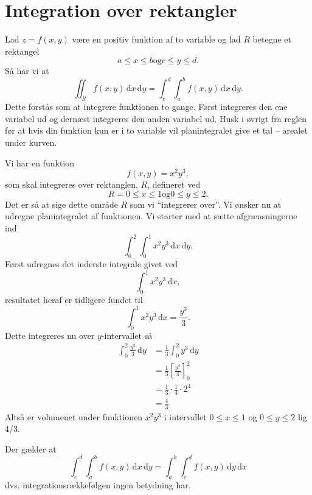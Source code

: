 \section{Integration over rektangler}
\begin{definition}[planintegralet]
    Lad $z = f(x,y)$ være en positiv funktion af to variable og lad $R$ betegne et rektangel
    \[ 
    a \leq x \leq b \text{og} c \leq y \leq d
    .\]
    Så har vi at 
    \[ 
    \iint_R f(x,y) \, \mathrm{d}x \, \mathrm{d}y = \int_{c}^{d} \int_{a}^{b} f(x,y) \, \mathrm{d}x \, \mathrm{d}y 
    .\]
    Dette forstås som at integrere funktionen to gange. Først integreres den ene variabel ud og dernæst integreres den anden variabel ud. Husk i øvrigt fra reglen før at hvis din funktion kun er i to variable vil planintegralet give et tal -- arealet under kurven.
\end{definition}

\begin{eks}
  Vi har en funktion
  \[ 
  f(x,y) = x^2y^3
  ,\]
  som skal integreres over rektanglen, $R$, defineret ved
  \[ 
  R = 0 \leq x \leq 1 \text{og} 0 \leq y \leq 2
  .\]
  Det er så at sige dette område $R$ som vi ``integrerer over''. Vi ønsker nu at udregne planintegralet af funktionen. Vi starter med at sætte afgrænsningerne ind
  \[ 
  \int_{0}^{2} \int_{0}^{1} x^2y^3 \, \mathrm{d}x \, \mathrm{d}y 
  .\]
  Først udregnes det inderste integrale givet ved
  \[ 
  \int_{0}^{1} x^2y^3 \, \mathrm{d}x 
  ,\]
  resultatet heraf er tidligere fundet til
  \[ 
  \int_{0}^{1} x^2y^3 \, \mathrm{d}x = \frac{y^3}{3}
  .\]
  Dette integreres nu over $y$-intervallet så
  \begin{align*}
    \int_{0}^{2} \frac{y^3}{3} \, \mathrm{d}y &= \frac{1}{3} \int_{0}^{2} y^3 \, \mathrm{d}y \\
    &= \frac{1}{3} \left[ \frac{y^4}{4} \right]_0^2  \\
    &= \frac{1}{3} \cdot \frac{1}{4} \cdot 2^4 \\
    &= \frac{4}{3}
  .\end{align*}
  Altså er volumenet under funktionen $x^2y^3$ i intervallet $0 \leq x \leq 1$ og $0 \leq y \leq 2$ lig 4/3.
\end{eks}

\begin{sæt}
  Der gælder at
  \[ 
  \int_{c}^{d} \int_{a}^{b} f(x,y) \, \mathrm{d}x \, \mathrm{d}y = \int_{a}^{b} \int_{c}^{d} f(x,y) \, \mathrm{d}y \, \mathrm{d}x 
  \]
  dvs. integrationsrækkefølgen ingen betydning har.
\end{sæt}


